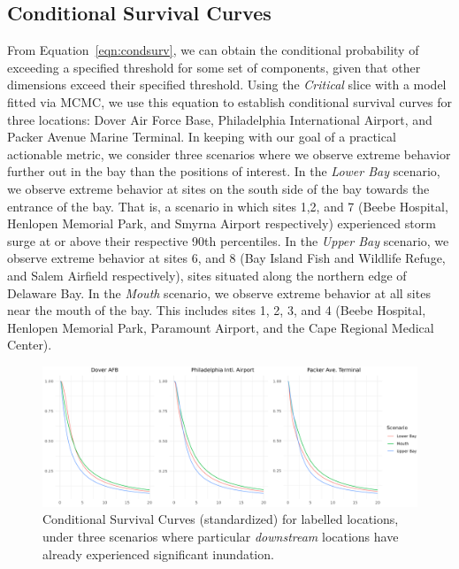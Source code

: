 \subsection{Conditional Survival Curves}
From Equation~\ref{eqn:condsurv}, we can obtain the conditional probability of
    exceeding a specified threshold for some set of components, given that other 
    dimensions exceed their specified threshold. Using the \emph{Critical} slice with 
    a model fitted via MCMC, we use this equation to establish conditional survival 
    curves for three locations: Dover Air Force Base, Philadelphia International 
    Airport, and Packer Avenue Marine Terminal.  In keeping with our goal of a 
    practical actionable metric, we consider three scenarios where we observe extreme 
    behavior further out in the bay than the positions of interest.  In the 
    \emph{Lower Bay} scenario, we observe extreme behavior at sites on the south 
    side of the bay towards the entrance of the bay.  That is, a scenario in which 
    sites 1,2, and 7 (Beebe Hospital, Henlopen Memorial Park, and Smyrna Airport 
    respectively) experienced storm surge at or above their respective 90th 
    percentiles.  In the \emph{Upper Bay} scenario, we observe extreme behavior 
    at sites 6, and 8 (Bay Island Fish and Wildlife Refuge, and Salem Airfield 
    respectively), sites situated along the northern edge of Delaware Bay.  In 
    the \emph{Mouth} scenario, we observe extreme behavior at all sites near the 
    mouth of the bay.  This includes sites 1, 2, 3, and 4 (Beebe Hospital, Henlopen Memorial Park, 
    Paramount Airport, and the Cape Regional Medical Center). 

\begin{figure}[tb]
    \centering
    \includegraphics[width=0.95\linewidth]{./plots/condsurv/condsurv_1d_mcmc.png}
    \caption{Conditional Survival Curves (standardized) for labelled locations, under three 
        scenarios where particular \emph{downstream} locations have already experienced 
        significant inundation.\label{fig:condsurv1d}}
\end{figure}

